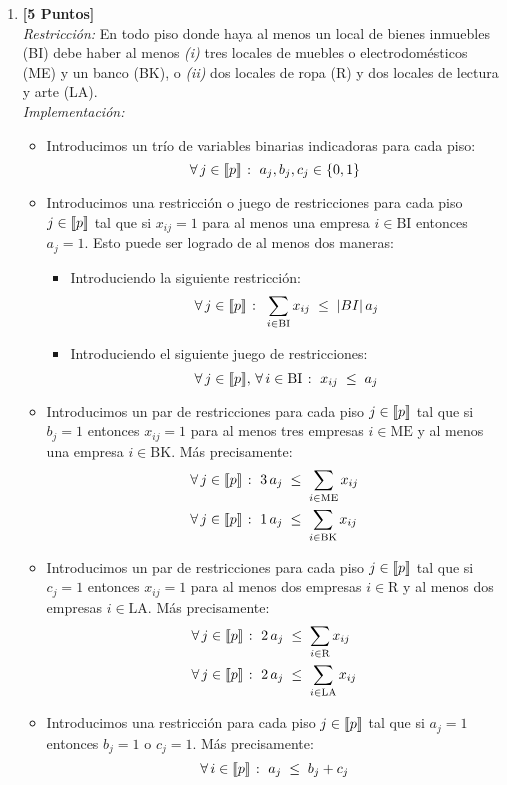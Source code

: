 \documentclass[ a4paper, twoside, 11pt]{article}
\begin{document}
\begin{problem}
\begin{enumerate}[label=\textbf{\alph*)}]
\item \textbf{[5 Puntos]} \\[1ex]
\emph{Restricci\'on:} En todo piso donde haya al menos un local de bienes inmuebles (BI) debe haber al menos \textit{(i)} tres locales de muebles o electrodom\'esticos (ME) y un banco (BK), o \textit{(ii)} dos locales de ropa (R) y dos locales de lectura y arte (LA). \\[1ex]
\emph{Implementaci\'on:}
\begin{itemize}
\item Introducimos un tr\'io de variables binarias indicadoras para cada piso: 
\[
\forall \, j \in \llbracket p \rrbracket \; \colon \; a_j, b_j, c_j \in \{ 0, 1 \}
\]
\item Introducimos una restricci\'on o juego de restricciones para cada piso $j \in \llbracket p \rrbracket$ tal que si $x_{ij} = 1$ para al menos una empresa $i \in \text{BI}$ entonces $a_j = 1$. Esto puede ser logrado de al menos dos maneras: 
\begin{itemize}
\item Introduciendo la siguiente restricci\'on: 
\[
\forall \, j \in \llbracket p \rrbracket \; \colon \;
\sum_{i \in \text{BI}} x_{ij} \; \leq \; |BI| \, a_j
\]
\item Introduciendo el siguiente juego de restricciones: 
\[
\forall \, j \in \llbracket p \rrbracket, \, \forall \, i \in \text{BI} \; \colon \;
x_{ij} \; \leq \; a_j
\]
\end{itemize}
\item Introducimos un par de restricciones para cada piso $j \in \llbracket p \rrbracket$ tal que si $b_j = 1$ entonces $x_{ij} = 1$ para al menos tres empresas $i \in \text{ME}$ y al menos una empresa $i \in \text{BK}$. \linebreak M\'as precisamente: 
\begin{align*}
& \forall \, j \in \llbracket p \rrbracket \; \colon \;
3 \, a_j \; \leq \; \sum_{i \in \text{ME}} x_{ij} \\
& \forall \, j \in \llbracket p \rrbracket \; \colon \;
1 \, a_j \; \leq \; \sum_{i \in \text{BK}} x_{ij}
\end{align*}
\item Introducimos un par de restricciones para cada piso $j \in \llbracket p \rrbracket$ tal que si $c_j = 1$ entonces $x_{ij} = 1$ para al menos dos empresas $i \in \text{R}$ y al menos dos empresas $i \in \text{LA}$. \linebreak M\'as precisamente: 
\begin{align*}
& \forall \, j \in \llbracket p \rrbracket \; \colon \;
2 \, a_j \; \leq \; \sum_{i \in \text{R}} x_{ij} \\
& \forall \, j \in \llbracket p \rrbracket \; \colon \;
2 \, a_j \; \leq \; \sum_{i \in \text{LA}} x_{ij}
\end{align*}
\item Introducimos una restricci\'on para cada piso $j \in \llbracket p \rrbracket$ tal que si $a_j = 1$ entonces $b_j = 1$ o $c_j = 1$. M\'as precisamente: 
\[
\forall \, i \in \llbracket p \rrbracket \; \colon \; a_j \; \leq \; b_j + c_j
\]
\end{itemize}

\end{enumerate}

\end{problem}
\end{document}
